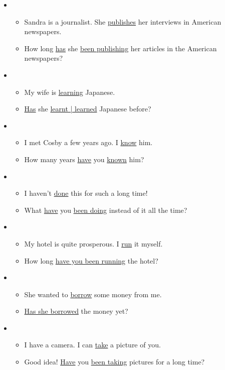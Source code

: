 \begin{itemize}

\item
\begin{itemize}
\item Sandra is a journalist. She \underline{publishes} her interviews in American newspapers.
\item How long \underline{has} she \underline{been publishing} her articles in the American newspapers?
\end{itemize}

\item
\begin{itemize}
\item My wife is \underline{learning} Japanese.
\item \underline{Has} she \underline{learnt | learned} Japanese before?
\end{itemize}

\item
\begin{itemize}
\item I met Cosby a few years ago. I \underline{know} him.
\item How many years \underline{have} you \underline{known} him?
\end{itemize}

\item
\begin{itemize}
\item I haven't \underline{done} this for such a long time!
\item What \underline{have} you \underline{been doing} instead of it all the time?
\end{itemize}

\item
\begin{itemize}
\item My hotel is quite prosperous. I \underline{run} it myself.
\item How long \underline{have you been running} the hotel?
\end{itemize}

\item
\begin{itemize}
\item She wanted to \underline{borrow} some money from me.
\item \underline{Has she borrowed} the money yet?
\end{itemize}

\item
\begin{itemize}
\item I have a camera. I can \underline{take} a picture of you.
\item Good idea! \underline{Have} you \underline{been taking} pictures for a long time?
\end{itemize}


\end{itemize}
